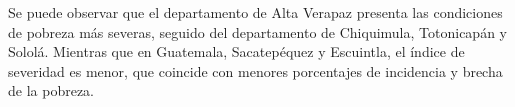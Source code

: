   Se puede observar que el departamento de Alta Verapaz presenta las condiciones de pobreza más severas, seguido del departamento de Chiquimula, Totonicapán y Sololá. Mientras que en Guatemala, Sacatepéquez y Escuintla, el índice de severidad es menor, que coincide con menores porcentajes de incidencia y brecha de la pobreza. 